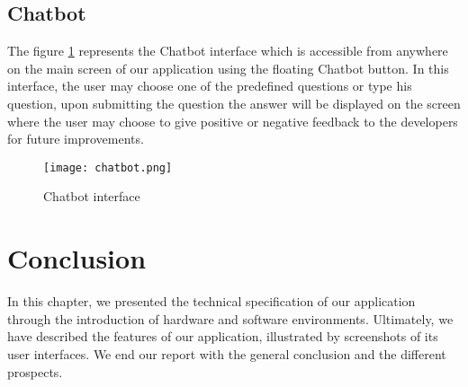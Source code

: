 \subsection{Chatbot}
The figure \ref{chatbot} represents the Chatbot interface which is accessible from anywhere on the main screen of our application using the floating Chatbot button. In this interface, the user may choose one of the predefined questions or type his question, upon submitting the question the answer will be displayed on the screen where the user may choose to give positive or negative feedback to the developers for future improvements.

\begin{figure}[H]%
    \center   
    
    \texttt{[image: chatbot.png]}
    \caption{Chatbot interface}
    \label{chatbot}
\end{figure}
\section*{Conclusion}
In this chapter, we presented the technical specification of our
application through the introduction of hardware and software environments. Ultimately,
we have described the features of our application,
illustrated by screenshots of its user interfaces.
We end our report with the general conclusion and the different
prospects.